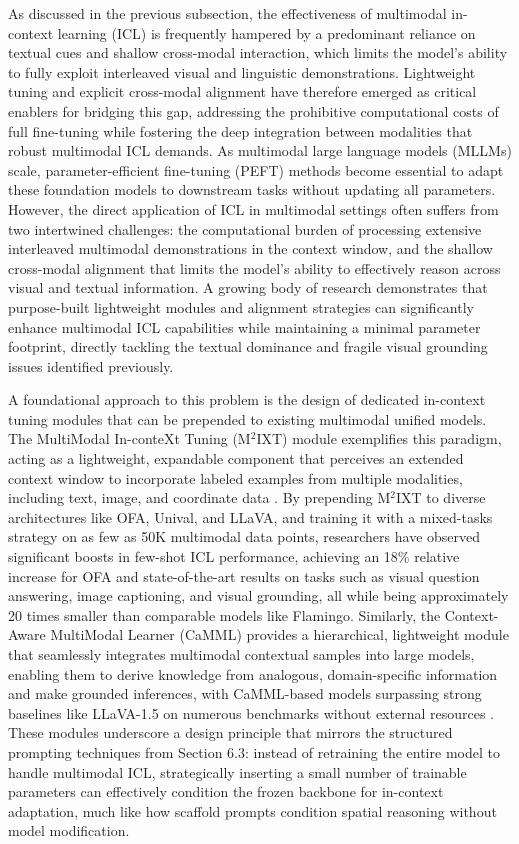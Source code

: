 \documentclass[11pt]{article}
\begin{document}
As discussed in the previous subsection, the effectiveness of multimodal in-context learning (ICL) is frequently hampered by a predominant reliance on textual cues and shallow cross-modal interaction, which limits the model's ability to fully exploit interleaved visual and linguistic demonstrations. Lightweight tuning and explicit cross-modal alignment have therefore emerged as critical enablers for bridging this gap, addressing the prohibitive computational costs of full fine-tuning while fostering the deep integration between modalities that robust multimodal ICL demands. As multimodal large language models (MLLMs) scale, parameter-efficient fine-tuning (PEFT) methods become essential to adapt these foundation models to downstream tasks without updating all parameters. However, the direct application of ICL in multimodal settings often suffers from two intertwined challenges: the computational burden of processing extensive interleaved multimodal demonstrations in the context window, and the shallow cross-modal alignment that limits the model's ability to effectively reason across visual and textual information. A growing body of research demonstrates that purpose-built lightweight modules and alignment strategies can significantly enhance multimodal ICL capabilities while maintaining a minimal parameter footprint, directly tackling the textual dominance and fragile visual grounding issues identified previously.

A foundational approach to this problem is the design of dedicated in-context tuning modules that can be prepended to existing multimodal unified models. The MultiModal In-conteXt Tuning (M\(^2\)IXT) module exemplifies this paradigm, acting as a lightweight, expandable component that perceives an extended context window to incorporate labeled examples from multiple modalities, including text, image, and coordinate data \cite{ref218}. By prepending M\(^2\)IXT to diverse architectures like OFA, Unival, and LLaVA, and training it with a mixed-tasks strategy on as few as 50K multimodal data points, researchers have observed significant boosts in few-shot ICL performance, achieving an 18\% relative increase for OFA and state-of-the-art results on tasks such as visual question answering, image captioning, and visual grounding, all while being approximately 20 times smaller than comparable models like Flamingo. Similarly, the Context-Aware MultiModal Learner (CaMML) provides a hierarchical, lightweight module that seamlessly integrates multimodal contextual samples into large models, enabling them to derive knowledge from analogous, domain-specific information and make grounded inferences, with CaMML-based models surpassing strong baselines like LLaVA-1.5 on numerous benchmarks without external resources \cite{ref246}. These modules underscore a design principle that mirrors the structured prompting techniques from Section 6.3: instead of retraining the entire model to handle multimodal ICL, strategically inserting a small number of trainable parameters can effectively condition the frozen backbone for in-context adaptation, much like how scaffold prompts condition spatial reasoning without model modification.
\end{document}
